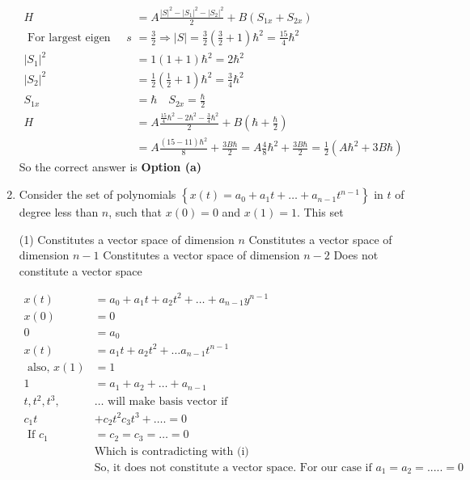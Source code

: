 \begin{enumerate}
\begin{answer}
\begin{align*}
	H&=A \frac{|S|^{2}-\left|S_{1}\right|^{2}-\left|S_{2}\right|^{2}}{2}+B\left(S_{1 x}+S_{2 x}\right)\\
	\text { For largest eigen value for } s&=\frac{3}{2} \Rightarrow|S|=\frac{3}{2}\left(\frac{3}{2}+1\right) \hbar^{2}=\frac{15}{4} \hbar^{2}\\
	\left|S_{1}\right|^{2}&=1(1+1) \hbar^{2}=2 \hbar^{2} \\
	\left|S_{2}\right|^{2}&=\frac{1}{2}\left(\frac{1}{2}+1\right) \hbar^{2}=\frac{3}{4} \hbar^{2}\\
	S_{1 x}&=\hbar \quad S_{2 x}=\frac{\hbar}{2}\\
	H&=A \frac{\frac{15}{4} \hbar^{2}-2 \hbar^{2}-\frac{3}{4} \hbar^{2}}{2}+B\left(\hbar+\frac{\hbar}{2}\right) \\
	&=A \frac{(15-11) \hbar^{2}}{8}+\frac{3 B \hbar}{2}=A \frac{4}{8} \hbar^{2}+\frac{3 B \hbar}{2}=\frac{1}{2}\left(A \hbar^{2}+3 B \hbar\right)
	\end{align*}
		So the correct answer is \textbf{Option (a)}
\end{answer}
\item  Consider the set of polynomials $\left\{x(t)=a_{0}+a_{1} t+\ldots+a_{n-1} t^{n-1}\right\}$ in $t$ of degree less than $n$, such that $x(0)=0$ and $x(1)=1$. This set
 \begin{tasks}(1)
	\task[\textbf{a.}]Constitutes a vector space of dimension $n$
	\task[\textbf{b.}]Constitutes a vector space of dimension $n-1$
	\task[\textbf{c.}]Constitutes a vector space of dimension $n-2$
	\task[\textbf{d.}]Does not constitute a vector space	
\end{tasks}
\begin{answer}
	\begin{align*}
	x(t)&=a_{0}+a_{1} t+a_{2} t^{2}+\ldots+a_{n-1} y^{n-1}\\
	x(0)&=0 \\
	0&=a_{0} \\
	x(t)&=a_{1} t+a_{2} t^{2}+\ldots a_{n-1} t^{n-1}\\
\text{	also, }x(1)&=1\\
	1&=a_{1}+a_{2}+\ldots+a_{n-1}\\
	t, t^{2}, t^{3},& \ldots \text { will make basis vector if }\\
	c_{1} t&+c_{2} t^{2} c_{3} t^{3}+\ldots .=0\\
\text{	If }c_{1}&=c_{2}=c_{3}=\ldots=0\\
&\text{Which is contradicting with (i)}\\
&\text{So, it does not constitute a vector space. For our case if $a_1=a_2=.....=0$}\\

\end{align*}
\end{answer}
\end{enumerate}

